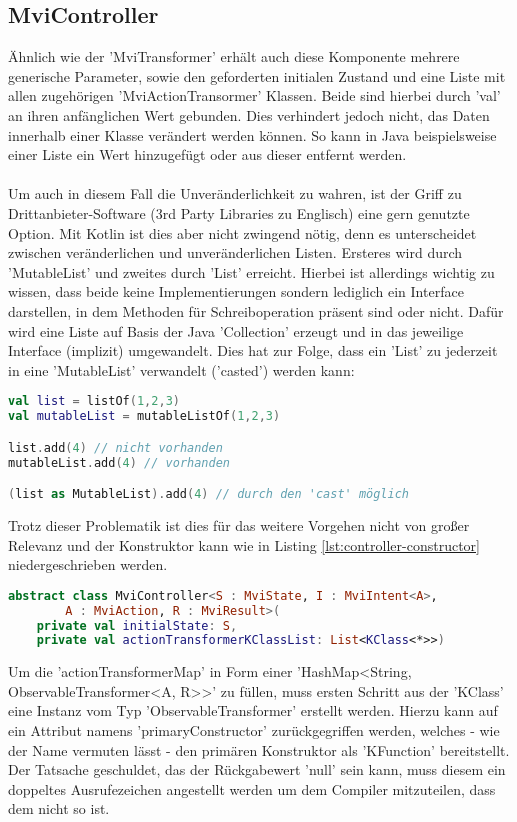 \subsection{MviController}
Ähnlich wie der 'MviTransformer' erhält auch diese Komponente mehrere generische Parameter, sowie den geforderten initialen Zustand und eine Liste mit allen zugehörigen 'MviActionTransormer' Klassen. Beide sind hierbei durch 'val' an ihren anfänglichen Wert gebunden. Dies verhindert jedoch nicht, das Daten innerhalb einer Klasse verändert werden können. So kann in Java beispielsweise einer Liste ein Wert hinzugefügt oder aus dieser entfernt werden.
\\\\
Um auch in diesem Fall die Unveränderlichkeit zu wahren, ist der Griff zu Drittanbieter-Software (3rd Party Libraries zu Englisch) eine gern genutzte Option. Mit Kotlin ist dies aber nicht zwingend nötig, denn es unterscheidet zwischen veränderlichen und unveränderlichen Listen. Ersteres wird durch 'MutableList' und zweites durch 'List' erreicht. Hierbei ist allerdings wichtig zu wissen, dass beide keine Implementierungen sondern lediglich ein Interface darstellen, in dem  Methoden für Schreiboperation präsent sind oder nicht. Dafür wird eine Liste auf Basis der Java 'Collection' erzeugt und in das jeweilige Interface (implizit) umgewandelt. Dies hat zur Folge, dass ein 'List' zu jederzeit in eine 'MutableList' verwandelt ('casted') werden kann:
\begin{lstlisting}[caption={'List' und 'MutableList'}, label={lst:list-and-mutable-list},language=Kotlin]
val list = listOf(1,2,3)
val mutableList = mutableListOf(1,2,3)

list.add(4) // nicht vorhanden
mutableList.add(4) // vorhanden

(list as MutableList).add(4) // durch den 'cast' möglich
\end{lstlisting}
\bigskip
Trotz dieser Problematik ist dies für das weitere Vorgehen nicht von großer Relevanz und der Konstruktor kann wie in Listing
\ref{lst:controller-constructor}
niedergeschrieben werden.
\begin{lstlisting}[caption={Konsruktor}, label={lst:controller-constructor},language=Kotlin]
abstract class MviController<S : MviState, I : MviIntent<A>, 
		A : MviAction, R : MviResult>(
	private val initialState: S,
	private val actionTransformerKClassList: List<KClass<*>>)
\end{lstlisting}
\bigskip
Um die 'actionTransformerMap' in Form einer 'HashMap<String, ObservableTransformer<A, R>>' zu füllen, muss ersten Schritt aus der 'KClass' eine Instanz vom Typ 'ObservableTransformer' erstellt werden. Hierzu kann auf ein Attribut namens 'primaryConstructor' zurückgegriffen werden, welches - wie der Name vermuten lässt - den primären Konstruktor als 'KFunction' bereitstellt. Der Tatsache geschuldet, das der Rückgabewert 'null' sein kann, muss diesem ein doppeltes Ausrufezeichen angestellt werden um dem Compiler mitzuteilen, dass dem nicht so ist.
